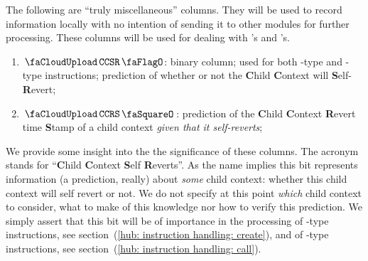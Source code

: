 The following are ``truly miscellaneous'' columns. They will be used to record information locally with no intention of sending it to other modules for further processing. These columns will be used for dealing with 's and 's.
\begin{enumerate}[resume]
	\item $\miscChildSelfReverts$:
		binary column; used for both -type and -type instructions; prediction of whether or not the \textbf{C}hild \textbf{C}ontext will \textbf{S}elf-\textbf{R}evert; 
	\item $\miscChildRevertStamp$:
		prediction of the \textbf{C}hild \textbf{C}ontext \textbf{R}evert time \textbf{S}tamp of a child context \emph{given that it self-reverts}; 
\end{enumerate}
We provide some insight into the the significance of these columns.
The acronym \miscChildSelfReverts{} stands for ``\textbf{C}hild \textbf{C}ontext \textbf{S}elf \textbf{R}everts''.
As the name implies this bit represents information (a prediction, really) about \emph{some} child context: whether this child context will self revert or not.
We do not specify at this point \emph{which} child context to consider, what to make of this knowledge nor how to verify this prediction.
We simply assert that this bit will be of importance in the processing of 
-type instructions, see section~(\ref{hub: instruction handling: create}), and of
-type instructions,   see section~(\ref{hub: instruction handling: call}).
